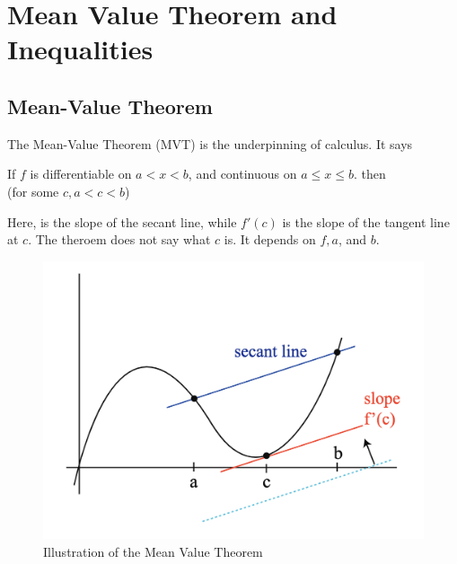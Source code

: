 

\chapter{Mean Value Theorem and Inequalities}

\bigbreak

\section{Mean-Value Theorem}

The Mean-Value Theorem (MVT) is the underpinning of calculus. It says
\begin{mdframed}
\begin{center}
    If $f$ is differentiable on $a < x < b$, and continuous on $a \leq x \leq b$. then \\
     (for some $c, a < c < b$)
\end{center}
\end{mdframed}

Here,  is the slope of the secant line, while $f'(c)$ is the slope of the tangent line at $c$.
The theroem does not say what $c$ is. It depends on $f, a$, and $b$.

\begin{figure}[ht!]
	\centering
	\includegraphics[scale=0.7]{./images/lecture_9_figure_1.png}
	\caption{Illustration of the Mean Value Theorem}
\end{figure}

